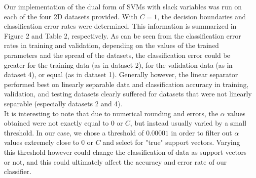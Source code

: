 \documentclass{article}
\begin{document}
Our implementation of the dual form of SVMs with slack variables was run on each of the four 2D datasets provided. With $C=1$, the decision boundaries and classification error rates were determined. This information is summarized in Figure 2 and Table 2, respectively. As can be seen from the classification error rates in training and validation, depending on the values of the trained parameters and the spread of the datasets, the classification error could be greater for the training data (as in dataset 2), for the validation data (as in dataset 4), or equal (as in dataset 1). Generally however, the linear separator performed best on linearly separable data and classification accuracy in training, validation, and testing datasets clearly suffered for datasets that were not linearly separable (especially datasets 2 and 4). \\

It is interesting to note that due to numerical rounding and errors, the $\alpha$ values obtained were not exactly equal to 0 or $C$, but instead usually varied by a small threshold. In our case, we chose a threshold of $0.00001$ in order to filter out $\alpha$ values extremely close to 0 or $C$ and select for "true" support vectors. Varying this threshold however could change the classification of data as support vectors or not, and this could ultimately affect the accuracy and error rate of our classifier.
\end{document}
